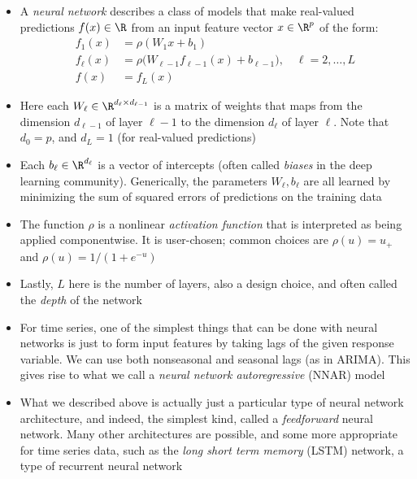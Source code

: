 \documentclass{article}
\begin{document}
\begin{itemize}
\item A \emph{neural network} describes a class of models that make real-valued
  predictions $f(x) \in \R$ from an input feature vector $x \in \R^p$ of the
  form:  
  \begin{align*}
  f_1(x) &= \rho(W_1 x + b_1) \\
  f_\ell(x) &= \rho \Big( W_{\ell-1} f_{\ell-1}(x) + b_{\ell-1} \Big), \quad
              \ell = 2,\dots,L \\
  f(x) &= f_L(x)
  \end{align*}

\item Here each $W_\ell \in \R^{d_\ell \times d_{\ell-1}}$ is a matrix of
  weights that maps from the dimension $d_{\ell-1}$ of layer $\ell-1$ to the
  dimension $d_\ell$ of layer $\ell$. Note that $d_0 = p$, and $d_L = 1$ (for
  real-valued predictions)

\item Each $b_\ell \in \R^{d_\ell}$ is a vector of intercepts (often called
  \emph{biases} in the deep learning community). Generically, the parameters
  $W_\ell,b_\ell$ are all learned by minimizing the sum of squared errors of
  predictions on the training data 

\item The function $\rho$ is a nonlinear \emph{activation function} that is 
  interpreted as being applied componentwise. It is user-chosen; common choices 
  are $\rho(u) = u_+$ and $\rho(u) = 1/(1+e^{-u})$

\item Lastly, $L$ here is the number of layers, also a design choice, and often 
  called the \emph{depth} of the network   

\item For time series, one of the simplest things that can be done with neural
  networks is just to form input features by taking lags of the given response
  variable. We can use both nonseasonal and seasonal lags (as in ARIMA). This
  gives rise to what we call a \emph{neural network autoregressive} (NNAR) model  

\item What we described above is actually just a particular type of neural
  network architecture, and indeed, the simplest kind, called a
  \emph{feedforward} neural network. Many other architectures are possible, and
  some more appropriate for time series data, such as the \emph{long short term
    memory} (LSTM) network, a type of recurrent neural network


\end{itemize}
\end{document}
